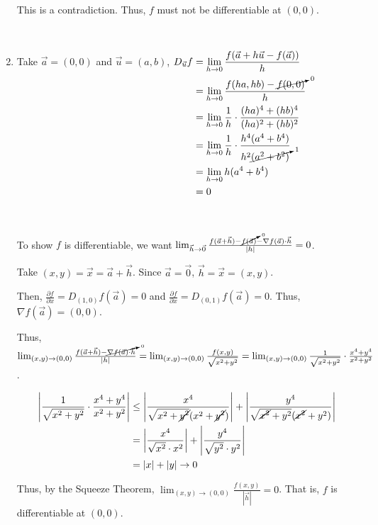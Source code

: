 \begin{enumerate}[label=\alph*)]
    This is a contradiction. Thus, $f$ must not be differentiable at $(0,0)$. 

    {~~~}

    \item Take $\vec{a} = (0,0)$ and $\vec{u} = (a,b)$,
    $\begin{aligned}[t]
        D_{\vec{u}} f
         & = \lim_{h\to0} \frac{f(\vec{a} + h\vec{u} - f(\vec{a}))}{h}                          \\
         & = \lim_{h\to0} \frac{f(ha, hb) - \cancelto{0}{f(0,0)}}{h}                            \\
         & = \lim_{h\to0} \frac{1}{h} \cdot \frac{(ha)^4 + (hb)^4}{(ha)^2 + (hb)^2}             \\
         & = \lim_{h\to0} \frac{1}{h} \cdot \frac{h^4(a^4 + b^4)}{h^2\cancelto{1}{(a^2 + b^2)}} \\
         & = \lim_{h\to0} h(a^4 + b^4)                                                          \\
         & = 0
    \end{aligned}$

    {~~~}

    To show $f$ is differentiable, we want $\lim_{\vec{h}\to\vec{0}} \frac{f(\vec{a} + \vec{h}) - \cancelto{0}{f(\vec{a})} - \nabla f(\vec{a}) \cdot \vec{h}}{|h|} = 0$. 

    Take $(x, y) = \vec{x} = \vec{a} + \vec{h}$. Since $\vec{a} = \vec{0}$, $\vec{h} = \vec{x} = (x, y)$.

    Then, $\frac{\partial f}{\partial x} = D_{(1,0)} f(\vec{a}) = 0$ and $\frac{\partial f}{\partial x} = D_{(0,1)} f(\vec{a}) = 0$. Thus, $\nabla f(\vec{a}) = (0,0)$. 

    Thus, $\lim_{(x,y)\to(0,0)} \frac{f(\vec{a} + \vec{h}) - \cancelto{0}{\nabla f(\vec{a}) \cdot \vec{h}}}{|h|} = \lim_{(x,y)\to(0,0)} \frac{f(x,y)}{\sqrt{x^2+y^2}} = \lim_{(x,y)\to(0,0)}\frac{1}{\sqrt{x^2 + y^2}} \cdot \frac{x^4 + y^4}{x^2 + y^2}$.

    \vfill\newpage

    \begin{align*}
        \left| \frac{1}{\sqrt{x^2+y^2}} \cdot \frac{x^4 + y^4}{x^2 + y^2} \right|
         & \le \left| \frac{x^4}{\sqrt{x^2 + \cancel{y^2}}(x^2 + \cancel{y^2})} \right| + \left| \frac{y^4}{\sqrt{\cancel{x^2} + y^2} (\cancel{x^2} + y^2)} \right| \\
         & =   \left| \frac{x^4}{\sqrt{x^2} \cdot x^2} \right| + \left| \frac{y^4}{\sqrt{y^2}\cdot y^2} \right| \\
         & =   | x | + | y | \to 0
    \end{align*}

    Thus, by the Squeeze Theorem, $\lim_{(x,y)\to(0,0)} \frac{f(x,y)}{|\vec{h}|} = 0$. That is, $f$ is differentiable at $(0,0)$.
\end{enumerate}

